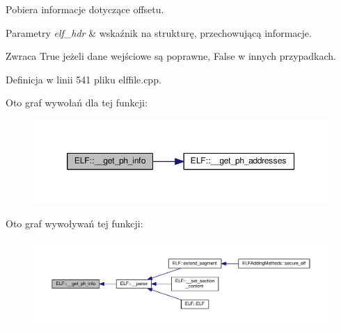 Pobiera informacje dotyczące offsetu. 


\begin{DoxyParams}{Parametry}
{\em elf\-\_\-hdr} & wskaźnik na strukturę, przechowującą informacje. \\
\hline
\end{DoxyParams}
\begin{DoxyReturn}{Zwraca}
True jeżeli dane wejściowe są poprawne, False w innych przypadkach. 
\end{DoxyReturn}


Definicja w linii 541 pliku elffile.\-cpp.



Oto graf wywołań dla tej funkcji\-:
\nopagebreak
\begin{figure}[H]
\begin{center}
\leavevmode
\includegraphics[width=350pt]{class_e_l_f_a87c1d41bc1b48048895805df2327028c_cgraph}
\end{center}
\end{figure}




Oto graf wywoływań tej funkcji\-:
\nopagebreak
\begin{figure}[H]
\begin{center}
\leavevmode
\includegraphics[width=350pt]{class_e_l_f_a87c1d41bc1b48048895805df2327028c_icgraph}
\end{center}
\end{figure}



